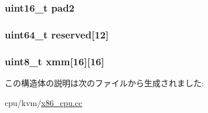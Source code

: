 \label{structFXSave_aeda1089d148f69b0f990f48cfbb032e6}
\hypertarget{structFXSave_a06d0aede0e856b45130b687a03806893}{
\subsubsection[{pad2}]{\setlength{\rightskip}{0pt plus 5cm}uint16\_\-t {\bf pad2}}}
\label{structFXSave_a06d0aede0e856b45130b687a03806893}
\hypertarget{structFXSave_a1af88b3e07af9c6b14d00132807e53ad}{
\subsubsection[{reserved}]{\setlength{\rightskip}{0pt plus 5cm}uint64\_\-t {\bf reserved}\mbox{[}12\mbox{]}}}
\label{structFXSave_a1af88b3e07af9c6b14d00132807e53ad}
\hypertarget{structFXSave_a0a70c3b20deed66804857c7998a83ded}{
\subsubsection[{xmm}]{\setlength{\rightskip}{0pt plus 5cm}uint8\_\-t {\bf xmm}\mbox{[}16\mbox{]}\mbox{[}16\mbox{]}}}
\label{structFXSave_a0a70c3b20deed66804857c7998a83ded}


この構造体の説明は次のファイルから生成されました:\begin{DoxyCompactItemize}
\item 
cpu/kvm/\hyperlink{x86__cpu_8cc}{x86\_\-cpu.cc}\end{DoxyCompactItemize}
